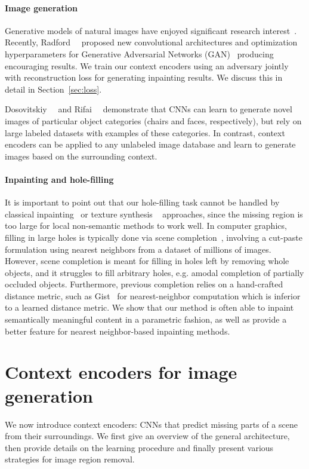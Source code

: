 \documentclass[10pt,twocolumn,letterpaper]{article}
\begin{document}
\paragraph{Image generation}
Generative models of natural images have enjoyed significant research interest~\cite{ranzato2013modeling,kingma2013auto,goodfellow2014generative}.
Recently, Radford~\etal~\cite{dcgan} proposed new convolutional architectures and optimization hyperparameters for Generative Adversarial Networks (GAN)~\cite{goodfellow2014generative} producing encouraging results.
We train our context encoders using an adversary jointly with reconstruction loss for generating inpainting results.
We discuss this in detail in Section~\ref{sec:loss}.

Dosovitskiy~\etal~\cite{chairs} and Rifai~\etal~\cite{torontofaces} demonstrate that CNNs can learn to generate novel images of particular object categories (chairs and faces, respectively), but rely on large labeled datasets with examples of these categories.
In contrast, context encoders can be applied to any unlabeled image database and learn to generate images based on the surrounding context.


\paragraph{Inpainting and hole-filling}
It is important to point out that our hole-filling task cannot be handled by classical inpainting~\cite{bertalmio2000image,osher2005iterative} or texture synthesis ~\cite{efros1999texture,barnes2009patchmatch} approaches, since the missing region is too large for local non-semantic methods to work well.
In computer graphics, filling in large holes is typically done via scene completion~\cite{hays2007scene}, involving a cut-paste formulation using nearest neighbors from a dataset of millions of images. However, scene completion is meant for filling in holes left by removing whole objects, and it struggles to fill arbitrary holes, e.g. amodal completion of partially occluded objects.
Furthermore, previous completion relies on a hand-crafted distance metric, such as Gist~\cite{gist} for nearest-neighbor computation which is inferior to a learned distance metric.
We show that our method is often able to inpaint semantically meaningful content in a parametric fashion, as well as provide a better feature for nearest neighbor-based inpainting methods.


\section{Context encoders for image generation}
We now introduce context encoders: CNNs that predict missing parts of a scene from their surroundings.
We first give an overview of the general architecture, then provide details on the learning procedure and finally present various strategies for image region removal.
\end{document}
